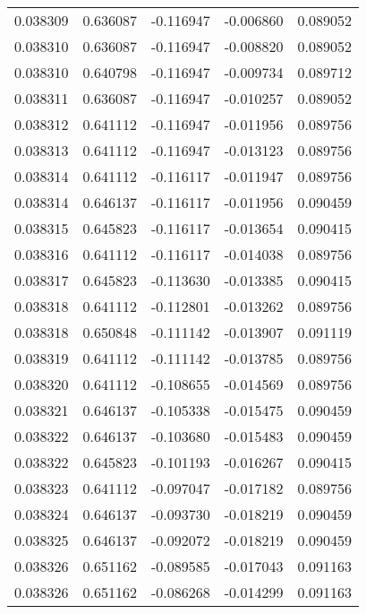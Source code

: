 \begin{tabular}{lrrrr}
0.038309    &  0.636087 & -0.116947 & -0.006860 &             0.089052 \\
0.038310    &  0.636087 & -0.116947 & -0.008820 &             0.089052 \\
0.038310    &  0.640798 & -0.116947 & -0.009734 &             0.089712 \\
0.038311    &  0.636087 & -0.116947 & -0.010257 &             0.089052 \\
0.038312    &  0.641112 & -0.116947 & -0.011956 &             0.089756 \\
0.038313    &  0.641112 & -0.116947 & -0.013123 &             0.089756 \\
0.038314    &  0.641112 & -0.116117 & -0.011947 &             0.089756 \\
0.038314    &  0.646137 & -0.116117 & -0.011956 &             0.090459 \\
0.038315    &  0.645823 & -0.116117 & -0.013654 &             0.090415 \\
0.038316    &  0.641112 & -0.116117 & -0.014038 &             0.089756 \\
0.038317    &  0.645823 & -0.113630 & -0.013385 &             0.090415 \\
0.038318    &  0.641112 & -0.112801 & -0.013262 &             0.089756 \\
0.038318    &  0.650848 & -0.111142 & -0.013907 &             0.091119 \\
0.038319    &  0.641112 & -0.111142 & -0.013785 &             0.089756 \\
0.038320    &  0.641112 & -0.108655 & -0.014569 &             0.089756 \\
0.038321    &  0.646137 & -0.105338 & -0.015475 &             0.090459 \\
0.038322    &  0.646137 & -0.103680 & -0.015483 &             0.090459 \\
0.038322    &  0.645823 & -0.101193 & -0.016267 &             0.090415 \\
0.038323    &  0.641112 & -0.097047 & -0.017182 &             0.089756 \\
0.038324    &  0.646137 & -0.093730 & -0.018219 &             0.090459 \\
0.038325    &  0.646137 & -0.092072 & -0.018219 &             0.090459 \\
0.038326    &  0.651162 & -0.089585 & -0.017043 &             0.091163 \\
0.038326    &  0.651162 & -0.086268 & -0.014299 &             0.091163 \\

\end{tabular}
